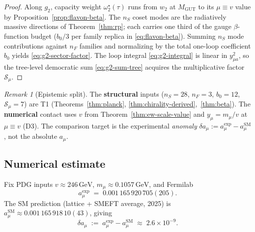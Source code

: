 \documentclass[aps,prd,onecolumn,amsmath,amssymb,nofootinbib,11pt]{revtex4-2}
\numberwithin{equation}{section}
\theoremstyle{plain}
\theoremstyle{definition}
\theoremstyle{remark}
\newtheorem{remark}[theorem]{Remark}
\begin{document}
\begin{proof}
Along $g_2$, capacity weight $\omega^\star_2(\tau)$ runs from $w_2$ at
$M_{\mathrm{GUT}}$ to its $\mu\equiv v$ value by
Proposition~\ref{prop:flavon-beta}. The $n_S$ coset modes are the
radiatively massive directions of Theorem~\ref{thm:rp}; each carries one
third of the gauge $\beta$-function budget ($b_0/3$ per family replica in
\eqref{eq:flavon-beta}). Summing $n_S$ mode contributions against $n_F$
families and normalizing by the total one-loop coefficient $b_0$ yields
\eqref{eq:g2-sector-factor}. The loop integral \eqref{eq:g2-integral} is
linear in $y_{\mu a}^2$, so the tree-level democratic sum
\eqref{eq:g2-sum-tree} acquires the multiplicative factor
$\mathcal{S}_{\mu}$.
\end{proof}

\begin{remark}[Epistemic split]
The \textbf{structural} inputs ($n_S=28$, $n_F=3$, $b_0=12$,
$\mathcal{S}_{\mu}=7$) are T1 (Theorems~\ref{thm:planck},
\ref{thm:chirality-derived},~\ref{thm:beta}). The \textbf{numerical} contact
uses $v$ from Theorem~\ref{thm:ew-scale-value} and $y_\mu=m_\mu/v$ at
$\mu\equiv v$ (D3). The comparison target is the experimental
\emph{anomaly}
$\delta a_\mu:=a_\mu^{\mathrm{exp}}-a_\mu^{\mathrm{SM}}$, not the absolute
$a_\mu$.
\end{remark}

\subsection{Numerical estimate}
\label{sec:g2:numeric}

Fix PDG inputs $v\approx246\,\mathrm{GeV}$, $m_\mu\approx0.1057\,\mathrm{GeV}$,
and Fermilab~\cite{MuonG2FNAL2025}
\begin{equation}\label{eq:amu-fnal}
  a_\mu^{\mathrm{exp}}
  \;=\;
  0.001\,165\,920\,705(205).
\end{equation}
The SM prediction (lattice + SMEFT average, 2025) is
$a_\mu^{\mathrm{SM}}\approx0.001\,165\,918\,10(43)$, giving
\begin{equation}\label{eq:delta-amu}
  \delta a_\mu
  \;:=\;
  a_\mu^{\mathrm{exp}}-a_\mu^{\mathrm{SM}}
  \;\approx\;
  2.6\times10^{-9}.
\end{equation}
\end{document}
